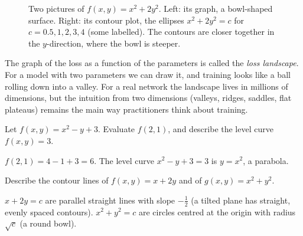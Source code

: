 \begin{figure}[htbp]
\centering
{}\hfill
{}
\caption{Two pictures of $f(x, y) = x^2 + 2y^2$. Left: its graph, a bowl-shaped
  surface. Right: its contour plot, the ellipses $x^2 + 2y^2 = c$ for
  $c = 0.5, 1, 2, 3, 4$ (some labelled). The contours are closer together in the
  $y$-direction, where the bowl is steeper.}
\label{fig:surface-contour}
\end{figure}

\begin{mlnote}
The graph of the loss as a function of the parameters is called the
\emph{loss landscape}. For a model with two parameters we can draw it, and
training looks like a ball rolling down into a valley. For a real network the
landscape lives in millions of dimensions, but the intuition from two
dimensions (valleys, ridges, saddles, flat plateaus) remains the main way
practitioners think about training.
\end{mlnote}

\sectionexercises

\begin{exercise}
Let $f(x, y) = x^2 - y + 3$. Evaluate $f(2, 1)$, and describe the level curve
$f(x, y) = 3$.
\end{exercise}
\begin{solution}
$f(2,1) = 4 - 1 + 3 = 6$. The level curve $x^2 - y + 3 = 3$ is $y = x^2$, a
parabola.
\end{solution}

\begin{exercise}
Describe the contour lines of $f(x, y) = x + 2y$ and of
$g(x, y) = x^2 + y^2$.
\end{exercise}
\begin{solution}
$x + 2y = c$ are parallel straight lines with slope $-\tfrac12$ (a tilted plane
has straight, evenly spaced contours). $x^2 + y^2 = c$ are circles centred at
the origin with radius $\sqrt c$ (a round bowl).
\end{solution}

